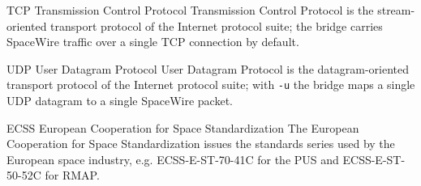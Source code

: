 
%
  {TCP}%
  {Transmission Control Protocol}%
  {Transmission Control Protocol is the stream-oriented transport protocol of %
   the Internet protocol suite; the bridge carries \gls{SpaceWire} traffic %
   over a single TCP connection by default.}%

%
  {UDP}%
  {User Datagram Protocol}%
  {User Datagram Protocol is the datagram-oriented transport protocol of the %
   Internet protocol suite; with \texttt{-u} the bridge maps a single UDP %
   datagram to a single \gls{SpaceWire} packet.}%

%
  {ECSS}%
  {European Cooperation for Space Standardization}%
  {The European Cooperation for Space Standardization issues the standards %
   series used by the European space industry, e.g. ECSS-E-ST-70-41C for the %
   \gls{PUS} and ECSS-E-ST-50-52C for \gls{RMAP}.}%



\glsresetall
\makeglossaries

